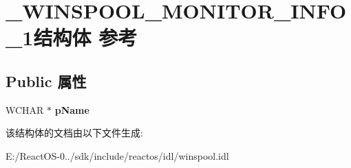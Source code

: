 \hypertarget{struct___w_i_n_s_p_o_o_l___m_o_n_i_t_o_r___i_n_f_o__1}{}\section{\+\_\+\+W\+I\+N\+S\+P\+O\+O\+L\+\_\+\+M\+O\+N\+I\+T\+O\+R\+\_\+\+I\+N\+F\+O\+\_\+1结构体 参考}
\label{struct___w_i_n_s_p_o_o_l___m_o_n_i_t_o_r___i_n_f_o__1}
\subsection*{Public 属性}
\begin{DoxyCompactItemize}
\item 
\mbox{\label{struct___w_i_n_s_p_o_o_l___m_o_n_i_t_o_r___i_n_f_o__1_abeef3aa6e9db899ed5dd21fd27a4899f}} 
W\+C\+H\+AR $\ast$ {\bfseries p\+Name}
\end{DoxyCompactItemize}


该结构体的文档由以下文件生成\+:\begin{DoxyCompactItemize}
\item 
E\+:/\+React\+O\+S-\/0../sdk/include/reactos/idl/winspool.\+idl\end{DoxyCompactItemize}
